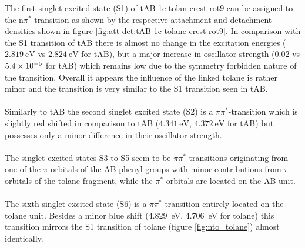 %
The first singlet excited state (S1) of tAB-1c-tolan-crest-rot9 can be assigned to the n$\pi^{*}$-transition as shown by the respective attachment and detachment densities shown in figure \ref{fig:att-det:tAB-1c-tolane-crest-rot9}. 
In comparison with the S1 transition of tAB there is almost no change in the excitation energies ($\SI{2.819}{\eV}$ vs $\SI{2.824}{\eV}$ for tAB), but a major increase in oscillator strength ($0.02$ vs $\SI{5.4E-5}{}$ for tAB) which remains low due to the symmetry forbidden nature of the transition. 
Overall it appears the influence of the linked tolane is rather minor and the transition is very similar to the S1 transition seen in tAB. \\
\\
Similarly to tAB the second singlet excited state (S2) is a $\pi \pi^{*}$-transition which is slightly red shifted in comparison to tAB ($\SI{4.341}{\eV}$, $\SI{4.372}{\eV}$ for tAB) but possesses only a minor difference in their oscillator strength. \\
\\
The singlet excited states S3 to S5 seem to be $\pi\pi^*$-transitions originating from one of the $\pi$-orbitals of the AB phenyl groups with minor contributions from $\pi$-orbitals of the tolane fragment, 
while the $\pi^*$-orbitals are located on the AB unit. \\
\\
The sixth singlet excited state (S6) is a $\pi\pi^{*}$-transition entirely located on the tolane unit. Besides a minor blue shift (\SI{4.829}{\eV},  \SI{4,706}{\eV} for tolane) this transition mirrors the S1 transition of tolane (figure \ref{fig:nto_tolane}) almost identically.\\

